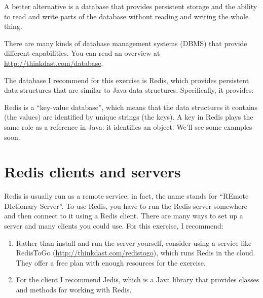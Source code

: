 \documentclass[12pt]{book}
\theoremstyle{exercise}
\newcommand{\java}{\verb}%}
\begin{document}
A better alternative is a database that provides persistent storage and
the ability to read and write parts of the database without reading and
writing the whole thing.


There are many kinds of database management systems (DBMS) that provide
different capabilities. You can read an overview at
\url{http://thinkdast.com/database}.


The database I recommend for this exercise is Redis, which provides
persistent data structures that are similar to Java data structures.
Specifically, it provides:


Redis is a ``key-value database'', which means that the data structures
it contains (the values) are identified by unique strings (the keys). A
key in Redis plays the same role as a reference in Java: it identifies
an object. We'll see some examples soon.



\section{Redis clients and servers}
\label{redis-clients-and-servers}


Redis is usually run as a remote service; in fact, the name stands for
``REmote DIctionary Server''. To use Redis, you have to run the Redis
server somewhere and then connect to it using a Redis client. There are
many ways to set up a server and many clients you could use. For this
exercise, I recommend:

\begin{enumerate}

\item
  Rather than install and run the server yourself, consider using a
  service like RedisToGo (\url{http://thinkdast.com/redistogo}), which runs
  Redis in the cloud. They offer a free plan with enough resources for
  the exercise.

\item
  For the client I recommend Jedis, which is a Java library that
  provides classes and methods for working with Redis.

\end{enumerate}
\end{document}

